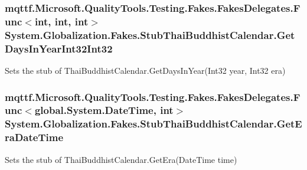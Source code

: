 \hypertarget{class_system_1_1_globalization_1_1_fakes_1_1_stub_thai_buddhist_calendar_a97b2be2ad1f2102330391e0ada7681e6}{
\subsubsection[{Get\-Days\-In\-Year\-Int32\-Int32}]{\setlength{\rightskip}{0pt plus 5cm}mqttf.\-Microsoft.\-Quality\-Tools.\-Testing.\-Fakes.\-Fakes\-Delegates.\-Func$<$int, int, int$>$ System.\-Globalization.\-Fakes.\-Stub\-Thai\-Buddhist\-Calendar.\-Get\-Days\-In\-Year\-Int32\-Int32}}\label{class_system_1_1_globalization_1_1_fakes_1_1_stub_thai_buddhist_calendar_a97b2be2ad1f2102330391e0ada7681e6}


Sets the stub of Thai\-Buddhist\-Calendar.\-Get\-Days\-In\-Year(\-Int32 year, Int32 era)

\hypertarget{class_system_1_1_globalization_1_1_fakes_1_1_stub_thai_buddhist_calendar_ac74bd450c5b6eb6b266fd083fab3e459}{
\subsubsection[{Get\-Era\-Date\-Time}]{\setlength{\rightskip}{0pt plus 5cm}mqttf.\-Microsoft.\-Quality\-Tools.\-Testing.\-Fakes.\-Fakes\-Delegates.\-Func$<$global.\-System.\-Date\-Time, int$>$ System.\-Globalization.\-Fakes.\-Stub\-Thai\-Buddhist\-Calendar.\-Get\-Era\-Date\-Time}}\label{class_system_1_1_globalization_1_1_fakes_1_1_stub_thai_buddhist_calendar_ac74bd450c5b6eb6b266fd083fab3e459}


Sets the stub of Thai\-Buddhist\-Calendar.\-Get\-Era(\-Date\-Time time)

